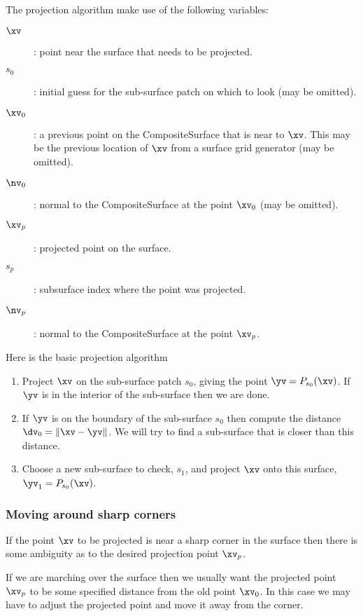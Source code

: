 The projection algorithm make use of the following variables:
\begin{description}
  \item[$\xv$] : point near the surface that needs to be projected.
  \item[$s_0$] : initial guess for the sub-surface patch on which to look (may be omitted).
  \item[$\xv_0$] : a previous point on the CompositeSurface that is near to $\xv$. This 
    may be the previous location of $\xv$ from a surface grid generator (may be omitted).
  \item[$\nv_0$] : normal to the CompositeSurface at the point $\xv_0$  (may be omitted).
  \item[$\xv_p$] : projected point on the surface.
  \item[$s_p$] : subsurface index where the point was projected.
  \item[$\nv_p$] : normal to the CompositeSurface at the point $\xv_p$.
\end{description}
Here is the basic projection algorithm
\begin{enumerate}
  \item Project $\xv$ on the sub-surface patch $s_0$, giving the point $\yv=P_{s_0}(\xv)$. If $\yv$
    is in the interior of the sub-surface then we are done.
  \item If $\yv$ is on the boundary of the sub-surface $s_0$ then compute the distance
     $\dv_0=\| \xv-\yv \|$. We will try to find a sub-surface that is closer than this
     distance.
  \item Choose a new sub-surface to check, $s_1$, and project $\xv$ onto this surface,
           $\yv_1=P_{s_0}(\xv)$.  
\end{enumerate}

\subsubsection{Moving around sharp corners}

If the point $\xv$ to be projected is near a sharp corner in the surface
then there is some ambiguity as to the desired projection point $\xv_p$. 


If we are
marching over the surface then we usually want the projected point $\xv_p$
to be some specified distance from the old point $\xv_0$. In this case 
we may have to adjust the projected point and move it away from the corner.





